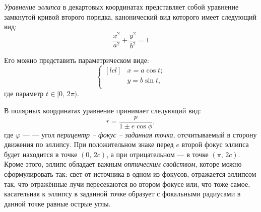 
{\itshape Уравнение эллипса} в декартовых координатах 
представляет собой уравнение замкнутой кривой второго 
порядка, канонический вид которого имеет следующий вид:
\begin{equation}
\frac{x^2}{a^2}+\frac{y^2}{b^2}=1
\end{equation}

Его можно представить параметрическом виде:\begin{equation}
\left\{\begin{aligned}[lcl]
&x=a\cos t;\\
&y=b\sin t,\\
\end{aligned}
\right.
\end{equation}
где параметр $t \in [0, \, 2\pi)$.

В полярных координатах уравнение принимает следующий вид:
\begin{equation}
r=\frac{p}{1\pm e\cos\phi},
\end{equation} 
где $\varphi$ ---  --- угол 
{\slshape перицентр -- фокус -- заданная точка}, 
отсчитываемый в сторону движения по эллипсу. При 
положительном знаке перед $e$ второй фокус эллипса будет 
находится в точке $(0, \, 2c)$, а при отрицательном --- в 
точке $(\pi, \, 2c)$.\\

Кроме этого, эллипс обладает важным {\itshape оптическим 
свойством}, которе можно сформулировать так: свет от источника в одном из фокусов, 
	отражается эллипсом так, что отражённые лучи пересекаются 
	во втором фокусе или, что тоже самое, касательная к эллипсу в заданной точке образует с фокальными радиусами в данной точке равные острые углы.






 
